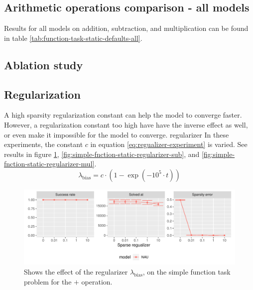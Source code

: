 \subsection{Arithmetic operations comparison - all models}

Results for all models on addition, subtraction, and multiplication can be found in table \ref{tab:function-task-static-defaults-all}.

\label{sec:appendix:function-task-static-all-comparision}


\subsection{Ablation study}


\subsection{Regularization}
\label{sec:appendix:simple-function-task:regualization}
A high sparsity regularization constant can help the model to converge faster. However, a regularization constant too high have have the inverse effect as well, or even make it impossible for the model to converge.
regularizer
In these experiments, the constant $c$ in equation \ref{eq:regualizer-experiment} is varied. See results in figure \ref{fig:simple-fnction-static-regularizer-add}, \ref{fig:simple-fnction-static-regularizer-sub}, and \ref{fig:simple-fnction-static-regularizer-mul}.
\begin{equation}
\lambda_{\mathrm{bias}} = c \cdot (1 - \exp(-10^5 \cdot t))
\label{eq:regualizer-experiment}
\end{equation}

\begin{figure}[h]
\centering
\includegraphics[width=\linewidth]{results/simple_function_static_regualization_add.pdf}
\caption{Shows the effect of the regularizer $\lambda_{\mathrm{bias}}$, on the simple function task problem for the $\bm{+}$ operation.}
\label{fig:simple-fnction-static-regularizer-add}
\end{figure}

